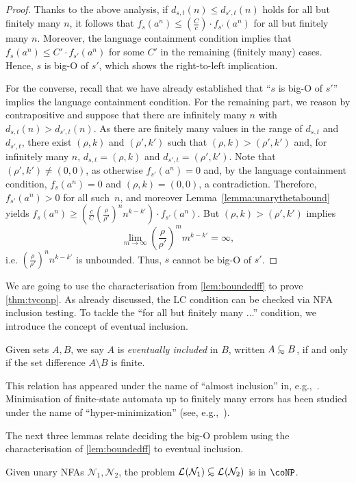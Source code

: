 \documentclass[10pt,a4paper]{amsart}
\numberwithin{equation}{section}
\theoremstyle{plain}
\theoremstyle{definition}
\theoremstyle{remark}
\newcommand\lng[2]{\mathcal{L}_{#1}(#2)}
\newcommand\dgf{d}
\newcommand\nfa{\mathcal{N}}
\renewcommand\nu{f}
\newcommand\abfsubset{\mathrel{{\ooalign{\hss\raisebox{-0.6ex}{\small$\sim$}\hss\cr\raisebox{0.4ex}{$\subset$}}}}
}
\begin{document}
\begin{proof}
Thanks to the above analysis,
if $\dgf_{s,t} (n) \le \dgf_{s',t}(n)$ holds for all but finitely many $n$, it follows that ${\nu_s(a^n)}\le (\frac{C}{c}) \cdot{\nu_{s'}(a^n)}$ for all but finitely many $n$.
Moreover, the language containment condition implies that $\nu_s(a^n)\le C'\cdot {\nu_{s'}(a^n)}$  for some $C'$ in the remaining (finitely many) cases.
Hence, $s$ is big-O of $s'$, which shows the right-to-left implication.

For the converse, recall that we have already established that ``$s$ is big-O of $s'$'' implies the language containment condition.
For the remaining part, we reason by contrapositive and suppose  that there are infinitely many $n$ with $\dgf_{s,t}(n) > \dgf_{s',t}(n)$.
As there are finitely many values in the range of $\dgf_{s,t}$ and $\dgf_{s',t}$,
there exist $(\rho,k)$ and $(\rho',k')$ such that $(\rho,k)>(\rho',k')$ and, for infinitely many $n$, $\dgf_{s,t}=(\rho,k)$ and $\dgf_{s',t}=(\rho',k')$.
Note that $(\rho',k') \ne (0,0)$, as otherwise $f_{s'}(a^n) = 0$ and,
by the language containment condition, $f_s(a^n) = 0$ and $(\rho, k) = (0, 0)$, a contradiction.
Therefore, $f_{s'}(a^n) > 0$ for all such~$n$, and moreover
Lemma~\ref{lemma:unarythetabound} yields $\nu_s(a^n) \ge (\frac{c}{C}(\frac{\rho}{\rho'})^n n^{k-k'})\cdot\nu_{s'}(a^n)$.
But $(\rho,k)>(\rho',k')$ implies
\[\lim_{m\to\infty} \left(\frac{\rho}{\rho'}\right)^m m^{k-k'} = \infty,
\]
 i.e. $(\frac{\rho}{\rho'})^n n^{k-k'}$ is unbounded.
Thus, $s$ cannot be big-O of $s'$.
\end{proof}

We are going to use the characterisation from \cref{lem:boundedff} to prove \cref{thm:tvconp}.
As already discussed, the LC condition can be checked via NFA inclusion testing. To tackle the ``for all but finitely many ...'' condition,
we introduce the concept of  {eventual inclusion}.

\begin{defi} Given sets $A,B$, we say $A$ is \textit{eventually included} in $B$,
written $A \abfsubset B$, if and only if the set difference $A \setminus B$ is finite.
\end{defi}

This relation has appeared under the name of ``almost inclusion'' in,
e.g.,~\cite{Senizergues93,FinkelT10,IanovskiMNN14}.
Minimisation of finite-state automata up to finitely many errors has been
studied under the name of ``hyper-minimization'' (see, e.g.,~\cite{BadrGS09,Maletti11}).

The next three lemmas relate deciding the big-O problem using the characterisation of  \cref{lem:boundedff} to eventual inclusion.
\begin{lem}\label{thm:abfsubsetconpbounded}
Given unary NFAs $\nfa_1, \nfa_2$, the problem $\lng{}{\nfa_1} \abfsubset \lng{}{\nfa_2}$ is in $\coNP$.
\end{lem}
\end{document}

